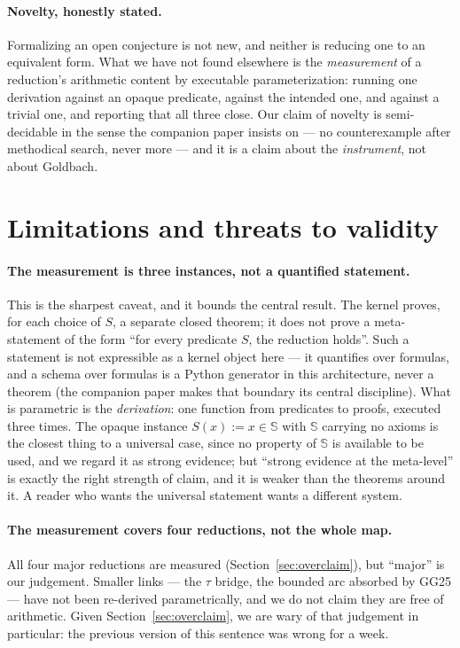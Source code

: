 \documentclass[11pt]{article}
\theoremstyle{remark}\newtheorem{remark}{Remark}
\begin{document}
\paragraph{Novelty, honestly stated.} Formalizing an open conjecture is not new, and
neither is reducing one to an equivalent form. What we have not found elsewhere is the
\emph{measurement} of a reduction's arithmetic content by executable parameterization:
running one derivation against an opaque predicate, against the intended one, and
against a trivial one, and reporting that all three close. Our claim of novelty is
semi-decidable in the sense the companion paper insists on --- no counterexample after
methodical search, never more --- and it is a claim about the \emph{instrument}, not
about Goldbach.

\section{Limitations and threats to validity}
\label{sec:limitations}

\paragraph{The measurement is three instances, not a quantified statement.} This is the
sharpest caveat, and it bounds the central result. The kernel proves, for each choice of
$S$, a separate closed theorem; it does not prove a meta-statement of the form ``for
every predicate $S$, the reduction holds''. Such a statement is not expressible as a
kernel object here --- it quantifies over formulas, and a schema over formulas is a
Python generator in this architecture, never a theorem (the companion paper makes that
boundary its central discipline). What is parametric is the \emph{derivation}: one
function from predicates to proofs, executed three times. The opaque instance
$S(x) := x \in \mathbb{S}$ with $\mathbb{S}$ carrying no axioms is the closest thing to
a universal case, since no property of $\mathbb{S}$ is available to be used, and we
regard it as strong evidence; but ``strong evidence at the meta-level'' is exactly the
right strength of claim, and it is weaker than the theorems around it. A reader who
wants the universal statement wants a different system.

\paragraph{The measurement covers four reductions, not the whole map.} All four major
reductions are measured (Section~\ref{sec:overclaim}), but ``major'' is our judgement.
Smaller links --- the $\tau$ bridge, the bounded arc absorbed by GG25 --- have not been
re-derived parametrically, and we do not claim they are free of arithmetic. Given
Section~\ref{sec:overclaim}, we are wary of that judgement in particular: the previous
version of this sentence was wrong for a week.
\end{document}
